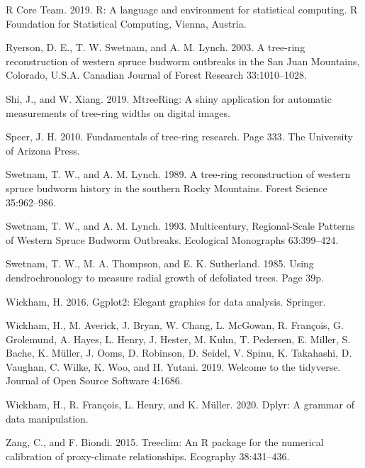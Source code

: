 \documentclass[review]{elsarticle} %
\begin{document}
\leavevmode\hypertarget{ref-RCore}{}%
R Core Team. 2019. R: A language and environment for statistical
computing. R Foundation for Statistical Computing, Vienna, Austria.

\leavevmode\hypertarget{ref-Ryerson2003}{}%
Ryerson, D. E., T. W. Swetnam, and A. M. Lynch. 2003. A tree-ring
reconstruction of western spruce budworm outbreaks in the San Juan
Mountains, Colorado, U.S.A. Canadian Journal of Forest Research
33:1010--1028.

\leavevmode\hypertarget{ref-Shi2019}{}%
Shi, J., and W. Xiang. 2019. MtreeRing: A shiny application for
automatic measurements of tree-ring widths on digital images.

\leavevmode\hypertarget{ref-Speer2010}{}%
Speer, J. H. 2010. Fundamentals of tree-ring research. Page 333. The
University of Arizona Press.

\leavevmode\hypertarget{ref-Swetnam1989}{}%
Swetnam, T. W., and A. M. Lynch. 1989. A tree-ring reconstruction of
western spruce budworm history in the southern Rocky Mountains. Forest
Science 35:962--986.

\leavevmode\hypertarget{ref-Swetnam1993}{}%
Swetnam, T. W., and A. M. Lynch. 1993. Multicentury, Regional-Scale
Patterns of Western Spruce Budworm Outbreaks. Ecological Monographs
63:399--424.

\leavevmode\hypertarget{ref-Swetnam1985}{}%
Swetnam, T. W., M. A. Thompson, and E. K. Sutherland. 1985. Using
dendrochronology to measure radial growth of defoliated trees. Page 39p.

\leavevmode\hypertarget{ref-wickham2016ggplot2}{}%
Wickham, H. 2016. Ggplot2: Elegant graphics for data analysis. Springer.

\leavevmode\hypertarget{ref-Wickham2019}{}%
Wickham, H., M. Averick, J. Bryan, W. Chang, L. McGowan, R. François, G.
Grolemund, A. Hayes, L. Henry, J. Hester, M. Kuhn, T. Pedersen, E.
Miller, S. Bache, K. Müller, J. Ooms, D. Robinson, D. Seidel, V. Spinu,
K. Takahashi, D. Vaughan, C. Wilke, K. Woo, and H. Yutani. 2019. Welcome
to the tidyverse. Journal of Open Source Software 4:1686.

\leavevmode\hypertarget{ref-Wickham2020dplyr}{}%
Wickham, H., R. François, L. Henry, and K. Müller. 2020. Dplyr: A
grammar of data manipulation.

\leavevmode\hypertarget{ref-Zang2015}{}%
Zang, C., and F. Biondi. 2015. Treeclim: An R package for the numerical
calibration of proxy-climate relationships. Ecography 38:431--436.
\end{document}
